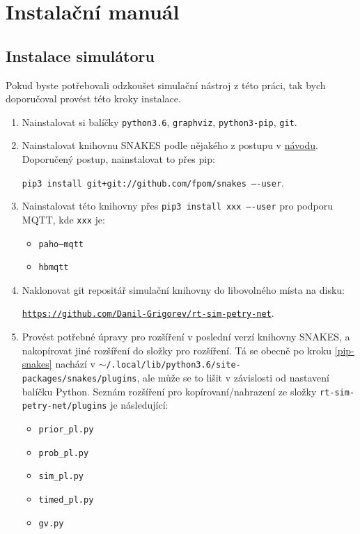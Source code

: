 \chapter{Instalační manuál}
\label{chap:instal-tutor}

\section{Instalace simulátoru}
Pokud byste potřebovali odzkoušet simulační nástroj z této práci, tak bych doporučoval provést této kroky instalace.
\begin{enumerate}
    \item Nainstalovat si balíčky \texttt{python3.6}, \texttt{graphviz}, \texttt{python3-pip}, \texttt{git}.
    \item Nainstalovat knihovnu SNAKES podle nějakého z postupu v \href{https://www.ibisc.univ-evry.fr/~fpommereau/SNAKES/first-steps-with-snakes.html}{návodu}. \label{pip-snakes}
    Doporučený postup, nainstalovat to přes pip:

    \texttt{pip3 install git+git://github.com/fpom/snakes ----user}.
    \item Nainstalovat této knihovny přes \texttt{pip3 install xxx ----user} pro podporu MQTT, kde \texttt{xxx} je:
    \begin{itemize}
        \item \texttt{paho--mqtt}
        \item \texttt{hbmqtt}
    \end{itemize}
    \item Naklonovat git repositář simulační knihovny do libovolného místa na disku:

    \href{https://github.com/Danil-Grigorev/rt-sim-petry-net}{\texttt{https://github.com/Danil-Grigorev/rt-sim-petry-net}}.
    \item Provést potřebné úpravy pro rozšíření  v poslední verzí knihovny SNAKES, a nakopírovat jiné rozšíření do složky pro rozšíření. Tá se obecně po kroku \ref{pip-snakes} nachází v \texttt{$\sim$/.local/lib/python3.6/site-packages/snakes/plugins}, ale může se to lišit v závislosti od nastavení balíčku Python. Seznám rozšíření pro kopírovaní/nahrazení ze složky \texttt{rt-sim-petry-net/plugins} je následující:
    \begin{itemize}
        \item \texttt{prior\_pl.py}
        \item \texttt{prob\_pl.py}
        \item \texttt{sim\_pl.py}
        \item \texttt{timed\_pl.py}
        \item \texttt{gv.py}
    \end{itemize}

\end{enumerate}

